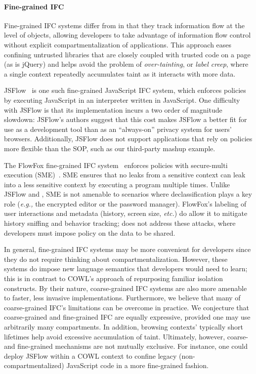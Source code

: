 \paragraph{Fine-grained IFC}
Fine-grained IFC systems differ from \sys{} in that they track
information flow at the level of objects, allowing developers to take
advantage of information flow control without explicit
compartmentalization of applications. This approach eases confining
untrusted libraries that are closely coupled with trusted code on a
page (as is jQuery) and helps avoid the problem of
\emph{over-tainting}, or \emph{label creep}, where a single context
repeatedly accumulates taint as it interacts with more data.

JSFlow~\cite{JSFlow} is one such fine-grained JavaScript IFC system, which
enforces policies by executing JavaScript in an interpreter written in
JavaScript.
%
One difficulty with JSFlow is that its implementation incurs a two
order of magnitude slowdown: JSFlow's authors suggest that this cost
makes JSFlow a better fit for use as a development tool than as an
``always-on'' privacy system for users' browsers.
%
Additionally, JSFlow does not support applications that rely on policies
more flexible than the SOP, such as our third-party mashup example.

The FlowFox fine-grained IFC system~\cite{DeGroef:2012} enforces
policies with secure-multi execution (SME)~\cite{Devriese:2010}. SME
ensures that no leaks from a sensitive context can leak into a less
sensitive context by executing a program multiple times.
%
Unlike JSFlow and \sys{}, SME is not amenable to
scenarios where declassification plays a key role (\emph{e.g.,} the encrypted
editor or the password manager).
%
FlowFox's labeling of user interactions and metadata (history, screen
size, \emph{etc.}) do allow it to mitigate history sniffing and
behavior tracking; \sys{} does not address these attacks, where
developers must impose policy on the data to be shared.

In general, fine-grained IFC systems may be more convenient for
developers since they do not require thinking about
compartmentalization.
%
However, these systems do impose new language semantics that
developers would need to learn; this is in contrast to COWL's approach
of repurposing familiar isolation constructs.
%
By their nature, coarse-grained IFC systems are also more amenable to
faster, less invasive implementations.
%
Furthermore, we believe that many of coarse-grained IFC's limitations
can be overcome in practice. We conjecture that coarse-grained and
fine-grained IFC are equally expressive, provided one may use
arbitrarily many compartments. In addition, browsing contexts'
typically short lifetimes help avoid excessive accumulation of taint.
%
Ultimately, however, coarse- and fine-grained mechanisms are not
mutually exclusive. For instance, one could deploy JSFlow within a
COWL context to confine legacy (non-compartmentalized) JavaScript code
in a more fine-grained fashion.

